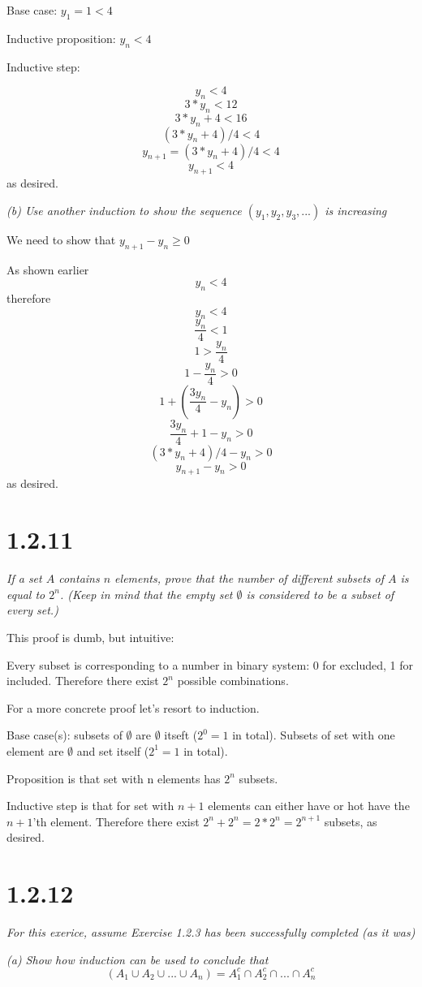 \documentclass[11pt,oneside,titlepage]{book}
\begin{document}
Base case: $y_1 = 1 < 4$

Inductive proposition: $y_n < 4$

Inductive step:

$$y_n < 4$$
$$3 * y_n < 12$$
$$3 * y_n + 4 < 16$$
$$(3 * y_n + 4) / 4 < 4$$
$$y_{n + 1} =  (3 * y_n + 4) / 4 < 4$$
$$y_{n + 1} < 4$$
as desired.

\textit{(b) Use another induction to show the sequence $(y_1, y_2, y_3,...)$
  is increasing}

We need to show that $y_{n + 1} - y_n \geq 0$

As shown earlier 
$$y_n < 4$$
therefore
$$ y_n < 4$$
$$ \frac{y_n}{4} < 1$$
$$1 > \frac{y_n}{4}$$
$$1 - \frac{y_n}{4} > 0$$
$$1 + (\frac{3 y_n}{4} - y_n) > 0$$
$$\frac{3 y_n}{4} + 1 - y_n > 0$$
$$(3 * y_n + 4) / 4 - y_n  > 0$$
$$y_{n + 1} - y_n  > 0$$
as desired.

\section*{1.2.11}
\textit{If a set $A$ contains $n$ elements, prove that the number of
  different subsets of $A$ is equal to $2^n$. (Keep in mind that the empty set
  $\emptyset$ is considered to be a subset of every set.)}

This proof is dumb, but intuitive:

Every subset is corresponding to a number in binary system: 0 for excluded,
1 for included. Therefore there exist $2^n$ possible combinations.

For a more concrete proof let's resort to induction.

Base case(s): subsets of $\emptyset$ are
$\emptyset$ itseft ($2^0 = 1$ in total). Subsets of
set with one element are $\emptyset$ and set itself ($2^1 = 1$ in total).

Proposition is that set with n elements has $2^n$ subsets.

Inductive step is that for set with $n + 1$ elements can either have or hot
have the $n + 1$'th element. Therefore there exist $2^n + 2^n = 2 * 2^n =
2^{n + 1}$ subsets, as desired.

\section*{1.2.12}
\textit{For this exerice, assume Exercise 1.2.3 has been successfully completed
  (as it was)}

\textit{(a) Show how induction can be used to conclude that }
$$ (A_1 \cup A_2 \cup ... \cup A_n) = A^c_1 \cap A^c_2 \cap ... \cap A^c_n$$
\end{document}
